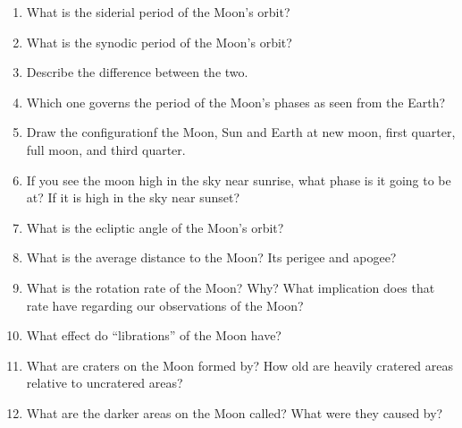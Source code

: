 
\begin{enumerate}
\item What is the siderial period of the Moon's orbit?
\vspace{80pt}
\item What is the synodic period of the Moon's orbit?
\vspace{80pt}
\item Describe the difference between the two.
\vspace{80pt}
\item Which one governs the period of the Moon's phases as seen from
  the Earth?
\vspace{80pt}
\item Draw the configurationf the Moon, Sun and Earth at new moon,
  first quarter, full moon, and third quarter.
\vspace{120pt}
\item If you see the moon high in the sky near sunrise, what phase is
  it going to be at? If it is high in the sky near sunset?
\vspace{80pt}
\item What is the ecliptic angle of the Moon's orbit?
\vspace{80pt}
\item What is the average distance to the Moon? Its perigee and apogee?
\vspace{80pt}
\item What is the rotation rate of the Moon? Why? What implication
  does that rate have regarding our observations of the Moon?
\vspace{80pt}
\item What effect do ``librations'' of the Moon have?
\vspace{80pt}
\item What are craters on the Moon formed by? How old are heavily
  cratered areas relative to uncratered areas?
\vspace{80pt}
\item What are the darker areas on the Moon called? What were they
  caused by?
\vspace{80pt}
\end{enumerate}
